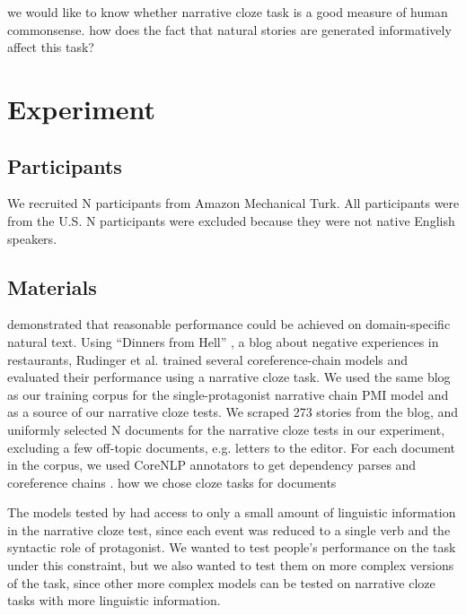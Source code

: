 \documentclass[10pt,a4paper]{article}
\newcommand{\todo}[1]{{\color{red}#1}}
\begin{document}
\todo{ we would like to know whether narrative cloze task is a good measure of human commonsense. how does the fact that natural stories are generated informatively affect this task? }

\section{Experiment}

\subsection{Participants}

We recruited \todo{N} participants from Amazon Mechanical Turk.
All participants were from the U.S.
\todo{N participants were excluded because they were not native English speakers.}

\subsection{Materials}

 demonstrated that reasonable performance could be achieved on domain-specific natural text.
Using ``Dinners from Hell'' \cite{dinnersfromhell}, a blog about negative experiences in restaurants, Rudinger et al. trained several coreference-chain models and evaluated their performance using a narrative cloze task.
We used the same blog as our training corpus for the single-protagonist narrative chain PMI model and as a source of our narrative cloze tests.
We scraped 273 stories from the blog, and uniformly selected \todo{N} documents for the narrative cloze tests in our experiment, excluding a few off-topic documents, e.g. letters to the editor.
For each document in the corpus, we used CoreNLP annotators \cite{corenlp} to get dependency parses \cite{depparse} and coreference chains \cite{coref2013a, coref2013b, coref2011, coref2010}.
\todo{how we chose cloze tasks for documents}

The models tested by  had access to only a small amount of linguistic information in the narrative cloze test, since each event was reduced to a single verb and the syntactic role of protagonist.
We wanted to test people's performance on the task under this constraint, but we also wanted to test them on more complex versions of the task, since other more complex models can be tested on narrative cloze tasks with more linguistic information.
\end{document}
